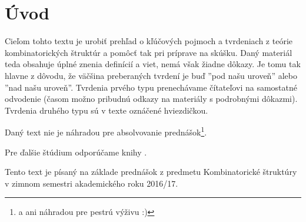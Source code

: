 \setcounter{chapter}{-1}
\chapter{Úvod}

Cieľom tohto textu je urobiť prehľad o kľúčových pojmoch a tvrdeniach z teórie kombinatorických štruktúr a pomôcť tak pri príprave na skúšku. 
Daný materiál teda obsahuje úplné znenia definícií a viet, nemá však žiadne dôkazy. Je tomu tak hlavne z dôvodu, že väčšina preberaných
tvrdení je buď ''pod našu uroveň'' alebo ''nad našu uroveň''. Tvrdenia prvého typu prenechávame čítateľovi na samostatné odvodenie (časom možno pribudnú odkazy
na materiály s podrobnými dôkazmi). Tvrdenia druhého typu sú v texte oznáčené hviezdičkou.

Daný text nie je náhradou pre absolvovanie prednášok\footnote{a ani náhradou pre pestrú výživu :)}.

Pre ďalšie štúdium odporúčame knihy \TODO.

Tento text je písaný na základe prednášok z predmetu Kombinatorické štruktúry v zimnom semestri akademického roku 2016/17.
